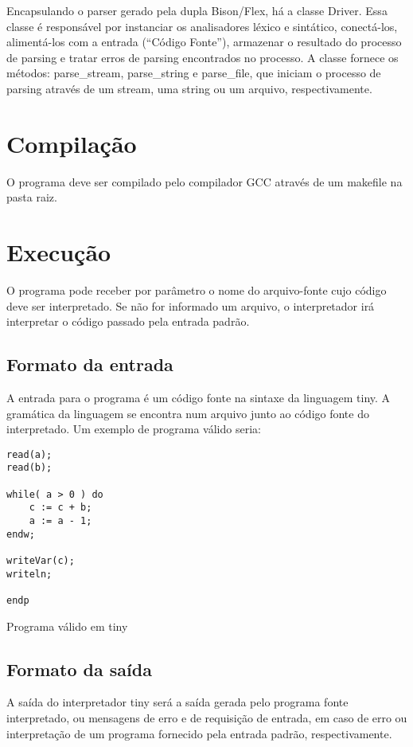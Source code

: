 \documentclass[12pt]{article}
\begin{document}
Encapsulando o parser gerado pela dupla Bison/Flex, há a classe Driver. Essa
classe é responsável por instanciar os analisadores léxico e sintático,
conectá-los, alimentá-los com a entrada (``Código Fonte''), armazenar o
resultado do processo de parsing e tratar erros de parsing encontrados no
processo. A classe fornece os métodos: parse\_stream, parse\_string e 
parse\_file, que iniciam o processo de parsing através de um stream, uma string
ou um arquivo, respectivamente.



\section{Compilação}

O programa deve ser compilado pelo compilador GCC através de um makefile na pasta raiz.

\section{Execução}

O programa pode receber por parâmetro o nome do arquivo-fonte cujo código deve 
ser interpretado. Se não for informado um arquivo, o interpretador irá
interpretar o código passado pela entrada padrão.

\subsection{Formato da entrada}

A entrada para o programa é um código fonte na sintaxe da linguagem tiny. A
gramática da linguagem se encontra num arquivo junto ao código fonte do
interpretado. Um exemplo de programa válido seria:

\begin{algorithm}[h!]
\begin{footnotesize}
\begin{verbatim}
read(a);
read(b);

while( a > 0 ) do
    c := c + b;
    a := a - 1;
endw;

writeVar(c);
writeln;

endp
\end{verbatim}	
\caption{Programa válido em tiny}%
\end{footnotesize}
\end{algorithm}



\subsection{Formato da saída}

A saída do interpretador tiny será a saída gerada pelo programa fonte
interpretado, ou mensagens de erro e de requisição de entrada, em caso de erro
ou interpretação de um programa fornecido pela entrada padrão, respectivamente.



\end{document}

